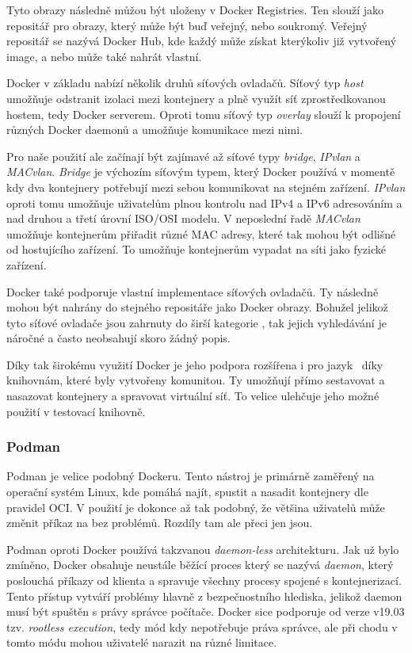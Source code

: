 Tyto obrazy následně můžou být uloženy v Docker Registries. Ten slouží jako repositář pro obrazy, který může být buď veřejný, nebo soukromý. Veřejný repositář se nazývá Docker Hub, kde každý může získat kterýkoliv již vytvořený image, a nebo může také nahrát vlastní. \cite{turnbull2014docker} 

Docker v základu nabízí několik druhů síťových ovladačů. Síťový typ \textit{host} umožňuje odstranit izolaci mezi kontejnery a plně využít síť zprostředkovanou hostem, tedy Docker serverem. Oproti tomu síťový typ \textit{overlay} slouží k propojení různých Docker daemonů a umožňuje komunikace mezi nimi. 

Pro naše použití ale začínají být zajímavé až síťové typy \textit{bridge}, \textit{IPvlan} a \textit{MACvlan}. \textit{Bridge} je výchozím síťovým typem, který Docker používá v momentě kdy dva kontejnery potřebují mezi sebou komunikovat na stejném zařízení. \textit{IPvlan} oproti tomu umožňuje uživatelům plnou kontrolu nad IPv4 a IPv6 adresováním a nad druhou a třetí úrovní ISO/OSI modelu. V neposlední řadě \textit{MACvlan} umožňuje kontejnerům přiřadit různé MAC adresy, které tak mohou být odlišné od hostujícího zařízení. To umožňuje kontejnerům vypadat na síti jako fyzické zařízení.

Docker také podporuje vlastní implementace síťových ovladačů. Ty následně mohou být nahrány do stejného repositáře jako Docker obrazy. Bohužel jelikož tyto síťové ovladače jsou zahrnuty do širší kategorie , tak jejich vyhledávání je náročné a často neobsahují skoro žádný popis. \cite{docker_networking_overview}\cite{docker_brige_overview}

Díky tak širokému využití Docker je jeho podpora rozšířena i pro jazyk \csharp~díky knihovnám, které byly vytvořeny komunitou. Ty umožňují přímo sestavovat a nasazovat kontejnery a spravovat virtuální síť. To velice ulehčuje jeho možné použití v testovací knihovně. 

\subsubsection{Podman}
Podman je velice podobný Dockeru. Tento nástroj je primárně zaměřený na operační systém Linux, kde pomáhá najít, spustit a nasadit kontejnery dle pravidel OCI. V použití je dokonce až tak podobný, že většina uživatelů může změnit příkaz  na  bez problémů. Rozdíly tam ale přeci jen jsou. 

Podman oproti Docker používá takzvanou \textit{daemon-less} architekturu. Jak už bylo zmíněno, Docker obsahuje neustále běžící proces který se nazývá \textit{daemon}, který poslouchá příkazy od klienta a spravuje všechny procesy spojené s kontejnerizací. Tento přístup vytváří problémy hlavně z bezpečnostního hlediska, jelikož daemon musí být spuštěn s právy správce počítače. Docker sice podporuje od verze v19.03 tzv. \textit{rootless execution}, tedy mód kdy nepotřebuje práva správce, ale při chodu v tomto módu mohou uživatelé narazit na různé limitace.

